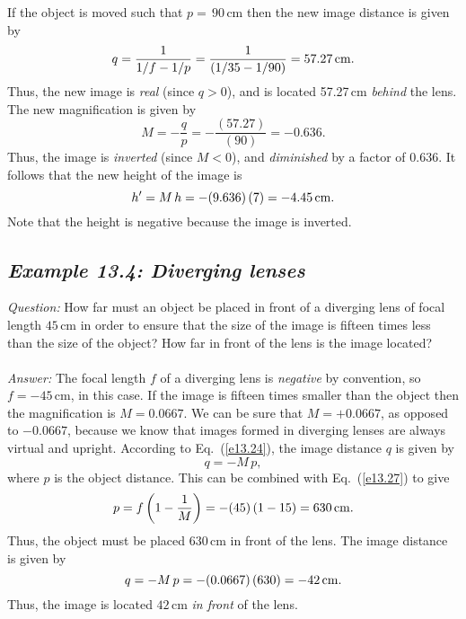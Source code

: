 If the object is moved such that $p=\,90$\,{\rm cm} then the
new image distance is given by
$$
q = \frac{1}{1/f - 1/p} = \frac{1}{(1/35-1/90)} = 57.27\,{\rm cm}.
$$
Thus, the new image is {\em real}\/ (since $q>0$), and is
located 57.27\,{\rm cm} {\em behind}\/ the lens. The new magnification is
given by
$$
M = -\frac{q}{p} = -\frac{(57.27)}{(90)} = -0.636.
$$
Thus, the image is {\em inverted}\/ (since $M<0$), and
{\em diminished}\/ by a factor of $0.636$. It follows that the
new height of the image
is
$$ 
h' = M\,h = -(9.636)\,(7) = -4.45\,{\rm cm}.
$$
Note that the height is negative because the image is inverted.

\subsection*{\em Example 13.4: Diverging lenses}
{\em Question:} How far must an object be
placed in front of a diverging lens
of focal length $45$\,cm in order to ensure that the
size of the image is fifteen times less than the
size of the object? How far in front of the lens is
 the image located?\\
~\\
{\em Answer:} The focal length $f$ of a diverging
lens  is {\em negative} by convention,
so  $f=-45$\,cm, in this case. 
If the image is fifteen times smaller than the object then the magnification
is 
$M=0.0667$. We can be sure that $M=+0.0667$, as opposed to $-0.0667$, because
we know that images formed in diverging lenses are always virtual and
upright. 
According to Eq.~(\ref{e13.24}), the image  distance $q$
is given by
$$
q = - M\,p,
$$
where $p$ is the object distance. This can be combined with Eq.~(\ref{e13.27})
to give
$$
p = f\left(1-\frac{1}{M}\right) = -(45)\,(1-15) = 630\,{\rm cm}.
$$
Thus, the object must be placed $630$\,cm in front of the lens. 
The image distance is given by
$$
q = -M\,p = -(0.0667)\,(630) = -42\,{\rm cm}.
$$
Thus, the image is located $42$\,cm {\em in front}\/ of the lens.
